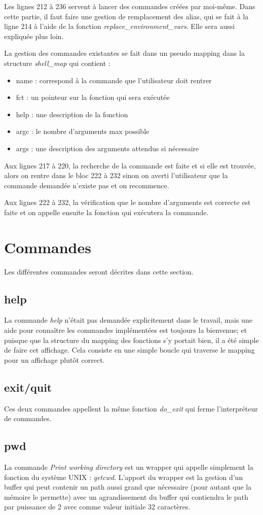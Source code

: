 \documentclass[a4paper,10pt]{article}
\begin{document}
Les lignes 212 à 236 servent à lancer des commandes créées par moi-même. Dans cette partie, il faut faire une gestion de remplacement des alias, qui se fait à la ligne 214 à l'aide de la fonction \emph{replace\_environment\_vars}. Elle sera aussi expliquée plus loin.
\pagebreak

La gestion des commandes existantes se fait dans un pseudo mapping dans la structure \emph{shell\_map} qui contient :
\begin{itemize}
	\item name : correspond à la commande que l'utilisateur doit rentrer
	\item fct : un pointeur sur la fonction qui sera exécutée
	\item help : une description de la fonction
	\item argc : le nombre d'arguments max possible
	\item args : une description des arguments attendus si nécessaire
\end{itemize}

Aux lignes 217 à 220, la recherche de la commande est faite et si elle est trouvée, alors on rentre dans le bloc 222 à 232 sinon on averti l'utilisateur que la commande demandée n'existe pas et on recommence.

Aux lignes 222 à 232, la vérification que le nombre d'arguments est correcte est faite et on appelle ensuite la fonction qui exécutera la commande.

\section{Commandes}
Les différentes commandes seront décrites dans cette section.
\subsection{help}
La commande \emph{help} n'était pas demandée explicitement dans le travail, mais une aide pour connaître les commandes implémentées est toujours la bienvenue; et puisque que la structure du mapping des fonctions s'y portait bien, il a été simple de faire cet affichage. Cela consiste en une simple boucle qui traverse le mapping pour un affichage plutôt correct.
\subsection{exit/quit}
Ces deux commandes appellent la même fonction \emph{do\_exit} qui ferme l'interpréteur de commandes.
\subsection{pwd}
La commande \emph{Print working directory} est un wrapper qui appelle simplement la fonction du système UNIX : \emph{getcwd}. L'apport du wrapper est la gestion d'un buffer qui peut contenir un path aussi grand que nécessaire (pour autant que la mémoire le permette) avec un agrandissement du buffer qui contiendra le path par puissance de 2 avec comme valeur initiale 32 caractères.
\end{document}
